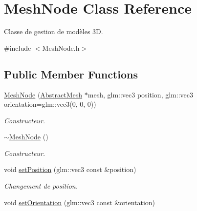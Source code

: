 \hypertarget{classMeshNode}{\section{Mesh\-Node Class Reference}
\label{classMeshNode}
}


Classe de gestion de modèles 3\-D.  




{\ttfamily \#include $<$Mesh\-Node.\-h$>$}

\subsection*{Public Member Functions}
\begin{DoxyCompactItemize}
\item 
\hypertarget{classMeshNode_ae0bd876e5fcb2adbf3de54823dedd99e}{\hyperlink{classMeshNode_ae0bd876e5fcb2adbf3de54823dedd99e}{Mesh\-Node} (\hyperlink{classAbstractMesh}{Abstract\-Mesh} $\ast$mesh, glm\-::vec3 position, glm\-::vec3 orientation=glm\-::vec3(0, 0, 0))}\label{classMeshNode_ae0bd876e5fcb2adbf3de54823dedd99e}

\begin{DoxyCompactList}\small\item\em Constructeur. \end{DoxyCompactList}\item 
\hypertarget{classMeshNode_abf8b858b11632dc9827b3ffa1cdc8c9b}{\hyperlink{classMeshNode_abf8b858b11632dc9827b3ffa1cdc8c9b}{$\sim$\-Mesh\-Node} ()}\label{classMeshNode_abf8b858b11632dc9827b3ffa1cdc8c9b}

\begin{DoxyCompactList}\small\item\em Constructeur. \end{DoxyCompactList}\item 
\hypertarget{classMeshNode_af597b2103f1cf7b226b2171474005cdc}{void \hyperlink{classMeshNode_af597b2103f1cf7b226b2171474005cdc}{set\-Position} (glm\-::vec3 const \&position)}\label{classMeshNode_af597b2103f1cf7b226b2171474005cdc}

\begin{DoxyCompactList}\small\item\em Changement de position. \end{DoxyCompactList}\item 
\hypertarget{classMeshNode_a60d28573a39499ea15e6bbc09b3d6c22}{void \hyperlink{classMeshNode_a60d28573a39499ea15e6bbc09b3d6c22}{set\-Orientation} (glm\-::vec3 const \&orientation)}\label{classMeshNode_a60d28573a39499ea15e6bbc09b3d6c22}


\end{DoxyCompactItemize}
